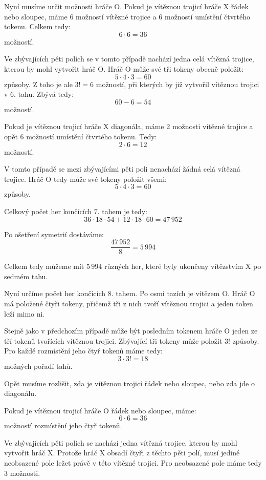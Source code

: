\documentclass[12pt,a4paper]{article}
\begin{document}
Nyní musíme určit možnosti hráče $\mathrm{O}$. 
Pokud je vítěznou trojicí hráče $\mathrm{X}$ řádek nebo sloupec, 
máme 6 možností vítězné trojice a 6 možností umístění čtvrtého tokenu. 
Celkem tedy:
\[
    6\cdot6 = 36
\]
možností.

Ve zbývajících pěti polích se v tomto případě nachází jedna celá vítězná trojice, 
kterou by mohl vytvořit hráč $\mathrm{O}$. 
Hráč $\mathrm{O}$ může své tři tokeny obecně položit:
\[
    5\cdot4\cdot3 = 60
\]
způsoby. Z toho je ale $3! = 6$ možností, 
při kterých by již vytvořil vítěznou trojici v 6. tahu. 
Zbývá tedy:
\[
    60-6 = 54
\]
možností.

Pokud je vítěznou trojicí hráče $\mathrm{X}$ diagonála, 
máme 2 možnosti vítězné trojice a opět 6 možností umístění čtvrtého tokenu. 
Tedy:
\[
    2\cdot6 = 12
\]
možností.

V tomto případě se mezi zbývajícími pěti poli nenachází žádná celá vítězná trojice. 
Hráč $\mathrm{O}$ tedy může své tokeny položit všemi:
\[
    5\cdot4\cdot3 = 60
\]
způsoby.

Celkový počet her končících 7. tahem je tedy:
\[
    36\cdot18\cdot54+12\cdot18\cdot60 = 47\,952
\]

Po ošetření symetrií dostáváme:
\begin{equation}
    \frac{47\,952}{8} = 5\,994
\end{equation}

Celkem tedy můžeme mít $5\,994$ různých her, 
které byly ukončeny vítězstvím $\mathrm{X}$ po sedmém tahu.

Nyní určíme počet her končících 8. tahem.
Po osmi tazích je vítězem $\mathrm{O}$. 
Hráč $\mathrm{O}$ má položené čtyři tokeny, 
přičemž tři z nich tvoří vítěznou trojici a jeden token leží mimo ni.

Stejně jako v předchozím případě může být posledním tokenem hráče 
$\mathrm{O}$ jeden ze tří tokenů tvořících vítěznou trojici. 
Zbývající tři tokeny může položit $3!$ způsoby. 
Pro každé rozmístění jeho čtyř tokenů máme tedy:
\[
    3\cdot3! = 18
\]
možných pořadí tahů.

Opět musíme rozlišit, zda je vítěznou trojicí řádek nebo sloupec, nebo zda jde o diagonálu.

Pokud je vítěznou trojicí hráče $\mathrm{O}$ řádek nebo sloupec, máme:
\[
    6\cdot6 = 36
\]
možností rozmístění jeho čtyř tokenů.

Ve zbývajících pěti polích se nachází jedna vítězná trojice, 
kterou by mohl vytvořit hráč $\mathrm{X}$. 
Protože hráč $\mathrm{X}$ obsadí čtyři z těchto pěti polí, 
musí jediné neobsazené pole ležet právě v této vítězné trojici. 
Pro neobsazené pole máme tedy 3 možnosti.
\end{document}

